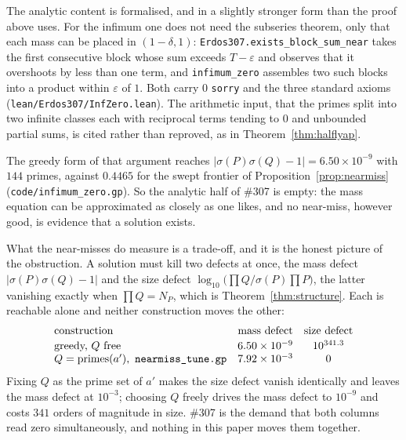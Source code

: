 \documentclass[11pt]{article}
\theoremstyle{definition}
\begin{document}
The analytic content is formalised, and in a slightly stronger form than the proof above uses. For
the infimum one does not need the subseries theorem, only that each mass can be placed in
$(1-\delta,1)$: \texttt{Erdos307.exists\_block\_sum\_near} takes the first consecutive block whose
sum exceeds $T-\varepsilon$ and observes that it overshoots by less than one term, and
\texttt{infimum\_zero} assembles two such blocks into a product within $\varepsilon$ of $1$. Both
carry $0$ \texttt{sorry} and the three standard axioms
\textup{(\texttt{lean/Erdos307/InfZero.lean})}. The arithmetic input, that the primes split into
two infinite classes each with reciprocal terms tending to $0$ and unbounded partial sums, is cited
rather than reproved, as in Theorem~\ref{thm:halflyap}.

The greedy form of that argument reaches $|\sigma(P)\sigma(Q)-1|=6.50\times10^{-9}$ with $144$
primes, against $0.4465$ for the swept frontier of Proposition~\ref{prop:nearmiss}
\textup{(\texttt{code/infimum\_zero.gp})}. So the analytic half of \#307 is empty: the mass equation
can be approximated as closely as one likes, and no near-miss, however good, is evidence that a
solution exists.

What the near-misses do measure is a trade-off, and it is the honest picture of the obstruction. A
solution must kill two defects at once, the mass defect $|\sigma(P)\sigma(Q)-1|$ and the size defect
$\log_{10}\bigl(\prod Q\big/\sigma(P)\prod P\bigr)$, the latter vanishing exactly when
$\prod Q=N_P$, which is Theorem~\ref{thm:structure}. Each is reachable alone and neither
construction moves the other:
\[
\begin{array}{lcc}
\text{construction} & \text{mass defect} & \text{size defect}\\[2pt]
\text{greedy, } Q \text{ free} & 6.50\times10^{-9} & 10^{341.3}\\
Q=\text{primes}(a'),\ \text{\texttt{nearmiss\_tune.gp}} & 7.92\times10^{-3} & 0
\end{array}
\]
Fixing $Q$ as the prime set of $a'$ makes the size defect vanish identically and leaves the mass
defect at $10^{-3}$; choosing $Q$ freely drives the mass defect to $10^{-9}$ and costs $341$ orders
of magnitude in size. \#307 is the demand that both columns read zero simultaneously, and nothing in
this paper moves them together.
\end{document}
